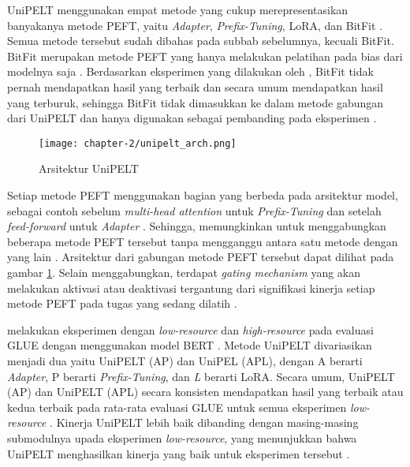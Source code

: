 UniPELT menggunakan empat metode yang cukup merepresentasikan banyakanya metode PEFT, yaitu \textit{Adapter}, \textit{Prefix-Tuning}, LoRA, dan BitFit \parencite{unipelt}. Semua metode tersebut sudah dibahas pada subbab sebelumnya, kecuali BitFit. BitFit merupakan metode PEFT yang hanya melakukan pelatihan pada bias dari modelnya saja \parencite{unipelt}. Berdasarkan eksperimen yang dilakukan oleh \citeauthor{unipelt}, BitFit tidak pernah mendapatkan hasil yang terbaik dan secara umum mendapatkan hasil yang terburuk, sehingga BitFit tidak dimasukkan ke dalam metode gabungan dari UniPELT dan hanya digunakan sebagai pembanding pada eksperimen \parencite{unipelt}.

\begin{figure}[h]
    \vspace{0.25cm}
    \centering
    \texttt{[image: chapter-2/unipelt\_arch.png]}
    \caption{Arsitektur UniPELT \parencite{unipelt}}
    \label{fig:unipelt_arch}
\end{figure}

Setiap metode PEFT menggunakan bagian yang berbeda pada arsitektur model, sebagai contoh sebelum \textit{multi-head attention} untuk \textit{Prefix-Tuning} dan setelah \textit{feed-forward} untuk \textit{Adapter} \parencite{unipelt}. Sehingga, memungkinkan untuk menggabungkan beberapa metode PEFT tersebut tanpa mengganggu antara satu metode dengan yang lain \parencite{unipelt}. Arsitektur dari gabungan metode PEFT tersebut dapat dilihat pada gambar \ref{fig:unipelt_arch}. Selain menggabungkan, terdapat \textit{gating mechanism} yang akan melakukan aktivasi atau deaktivasi tergantung dari signifikasi kinerja setiap metode PEFT pada tugas yang sedang dilatih \parencite{unipelt}.

\citeauthor{unipelt} melakukan eksperimen dengan \textit{low-resource} dan \textit{high-resource} pada evaluasi GLUE dengan menggunakan model BERT \parencite{unipelt}. Metode UniPELT divariasikan menjadi dua yaitu UniPELT (AP) dan UniPEL (APL), dengan A berarti \textit{Adapter}, P berarti \textit{Prefix-Tuning}, dan \textit{L} berarti LoRA. Secara umum, UniPELT (AP) dan UniPELT (APL) secara konsisten mendapatkan hasil yang terbaik atau kedua terbaik pada rata-rata evaluasi GLUE untuk semua eksperimen \textit{low-resource} \parencite{unipelt}. Kinerja UniPELT lebih baik dibanding dengan masing-masing submodulnya upada eksperimen \textit{low-resource}, yang menunjukkan bahwa UniPELT menghasilkan kinerja yang baik untuk eksperimen tersebut \parencite{unipelt}.

